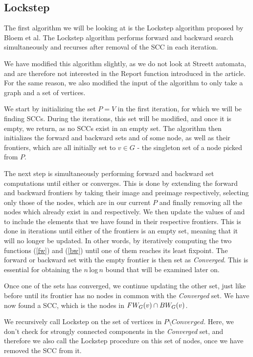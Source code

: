 \documentclass[../master/master.tex]{subfiles}
\begin{document}
\subsection{Lockstep}
The first algorithm we will be looking at is the Lockstep algorithm proposed by Bloem et al. \cite{lockstep} The Lockstep algorithm performs forward and backward search simultaneously and recurses after removal of the SCC in each iteration.

We have modified this algorithm slightly, as we do not look at Streett automata, and are therefore not interested in the Report function introduced in the article. For the same reason, we also modified the input of the algorithm to only take a graph and a set of vertices. 

We start by initializing the set $P=V$ in the first iteration, for which we will be finding SCCs. During the iterations, this set will be modified, and once it is empty, we return, as no SCCs exist in an empty set. The algorithm then initializes the forward and backward sets  and  of some node, as well as their frontiers, which are all initially set to $v\in G$ - the singleton set of a node picked from $P$.

The next step is simultaneously performing forward and backward set computations until either  or  converges. This is done by extending the forward and backward frontiers by taking their image and preimage respectively, selecting only those of the nodes, which are in our current $P$ and finally removing all the nodes which already exist in  and  respectively. We then update the values of  and  to include the elements that we have found in their respective frontiers. This is done in iterations until either of the frontiers is an empty set, meaning that it will no longer be updated.
In other words, by iteratively computing the two functions (\ref{fw}) and (\ref{bw}) until one of them reaches its least fixpoint. The forward or backward set with the empty frontier is then set as \emph{Converged}. This is essential for obtaining the $n$\,log\,$n$ bound that will be examined later on.

Once one of the sets has converged, we continue updating the other set, just like before until its frontier has no nodes in common with the \emph{Converged} set. 
We have now found a SCC, which is the nodes in $FW_{G}(v)\cap BW_{G}(v)$. 

We recursively call Lockstep on the set of vertices in $P\setminus Converged$. Here, we don't check for strongly connected components in the \emph{Converged} set, and therefore we also call the Lockstep procedure on this set of nodes, once we have removed the SCC from it.
\end{document}
